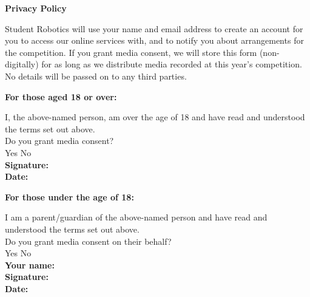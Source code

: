\documentclass[a4paper,10pt]{article}
\newcommand{\checkbox}[1]{#1\hspace{0.2cm}\raisebox{-0.3mm}{$\square$}}
\newcommand{\textfield}[1]{\textbf{#1:} \hrulefill\hspace{0mm}}
\newcommand{\fieldsep}{\\[2.5mm]}
\begin{document}
\textbf{\large Privacy Policy}\\\vspace{-3mm}

Student Robotics will use your name and email address to create an account for you to access our online services with, and to notify you about arrangements for the competition.
If you grant media consent, we will store this form (non-digitally) for as long as we distribute media recorded at this year's competition.
No details will be passed on to any third parties. \\

\begin{minipage}[t]{0.48\textwidth}
\textbf{For those aged 18 or over:}

I, the above-named person, am over the age of 18 and have read and understood the terms set out above.\\

Do you grant media consent? \\[2mm]
\checkbox{Yes} \hspace{1cm} \checkbox{No}\\

\textfield{Signature} \fieldsep
\textfield{Date}
\end{minipage}
\hspace{0.02\textwidth}
\begin{minipage}[t]{0.48\textwidth}
\textbf{For those under the age of 18:}

I am a parent/guardian of the above-named person and have read and understood the terms set out above.\\

Do you grant media consent on their behalf?\\[2mm]
\checkbox{Yes} \hspace{1cm} \checkbox{No}\\

\textfield{Your name} \fieldsep
\textfield{Signature} \fieldsep
\textfield{Date}
\end{minipage}
\end{document}
